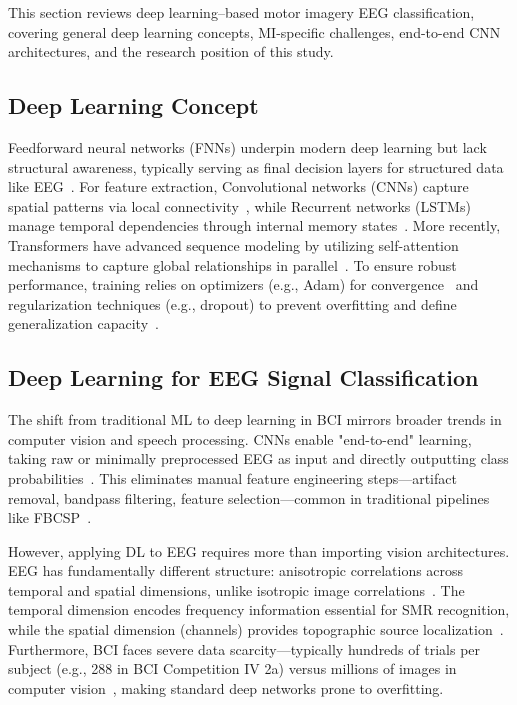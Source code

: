 This section reviews deep learning–based motor imagery EEG classification, covering general deep learning concepts, MI-specific challenges, end-to-end CNN architectures, and the research position of this study.

\subsection{Deep Learning Concept}

Feedforward neural networks (FNNs) underpin modern deep learning but lack structural awareness, typically serving as final decision layers for structured data like EEG~\cite{Walther2023A}. For feature extraction, Convolutional networks (CNNs) capture spatial patterns via local connectivity~\cite{Shiri2023A}, while Recurrent networks (LSTMs) manage temporal dependencies through internal memory states~\cite{Mienye2024Recurrent}. More recently, Transformers have advanced sequence modeling by utilizing self-attention mechanisms to capture global relationships in parallel~\cite{Hasan2023MALS-Net}. To ensure robust performance, training relies on optimizers (e.g., Adam) for convergence~\cite{Bartlett2021Deep} and regularization techniques (e.g., dropout) to prevent overfitting and define generalization capacity~\cite{Poggio2019Theoretical,Moradi2019A}.

\subsection{Deep Learning for EEG Signal Classification}

The shift from traditional ML to deep learning in BCI mirrors broader trends in computer vision and speech processing. CNNs enable "end-to-end" learning, taking raw or minimally preprocessed EEG as input and directly outputting class probabilities~\cite{schirrmeister2017deep,elouahidi2024strong,Dose2018An}. This eliminates manual feature engineering steps—artifact removal, bandpass filtering, feature selection—common in traditional pipelines like FBCSP~\cite{Peng2024,lawhern2018eegnet,Tibrewal2022Classification}.

However, applying DL to EEG requires more than importing vision architectures. EEG has fundamentally different structure: anisotropic correlations across temporal and spatial dimensions, unlike isotropic image correlations~\cite{kollod2023deep,padfield2019eeg}. The temporal dimension encodes frequency information essential for SMR recognition, while the spatial dimension (channels) provides topographic source localization~\cite{Belwafi2020An,Wei2023Decoding}. Furthermore, BCI faces severe data scarcity—typically hundreds of trials per subject (e.g., 288 in BCI Competition IV 2a) versus millions of images in computer vision~\cite{BCI2008GrazDataset}, making standard deep networks prone to overfitting.

